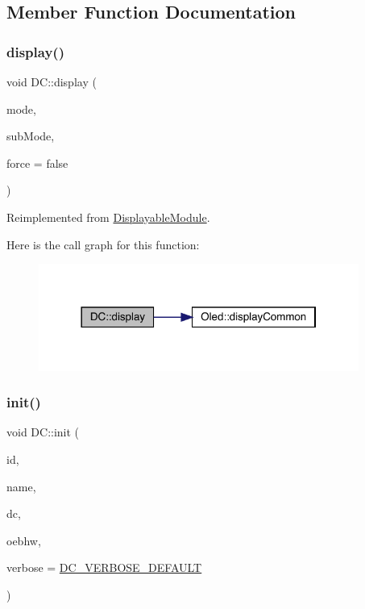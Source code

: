 \subsection{Member Function Documentation}
\mbox{\label{class_d_c_a006f266e63bdff5042fa2c443e1a04cc}} 
\subsubsection{\texorpdfstring{display()}{display()}}
{\footnotesize\ttfamily void D\+C\+::display (\begin{DoxyParamCaption}\item[{int}]{mode,  }\item[{int}]{sub\+Mode,  }\item[{bool}]{force = {\ttfamily false} }\end{DoxyParamCaption})\hspace{0.3cm}{\ttfamily [virtual]}}



Reimplemented from \mbox{\hyperlink{class_displayable_module_a02de26d62ef508cae9ed07920e21784d}{Displayable\+Module}}.

Here is the call graph for this function\+:\nopagebreak
\begin{figure}[H]
\begin{center}
\leavevmode
\includegraphics[width=298pt]{class_d_c_a006f266e63bdff5042fa2c443e1a04cc_cgraph}
\end{center}
\end{figure}
\mbox{\label{class_d_c_a767b3f22587703e7f59020d44872f432}} 
\subsubsection{\texorpdfstring{init()}{init()}}
{\footnotesize\ttfamily void D\+C\+::init (\begin{DoxyParamCaption}\item[{int}]{id,  }\item[{char $\ast$}]{name,  }\item[{Audio\+Synth\+Waveform\+Dc $\ast$}]{dc,  }\item[{\mbox{\hyperlink{class_open_effects_box_h_w}{Open\+Effects\+Box\+HW}} $\ast$}]{oebhw,  }\item[{int}]{verbose = {\ttfamily \mbox{\hyperlink{_d_c_8h_a41fb888bc7c99c6ae3c43304971faeb6}{D\+C\+\_\+\+V\+E\+R\+B\+O\+S\+E\+\_\+\+D\+E\+F\+A\+U\+LT}}} }\end{DoxyParamCaption})}

